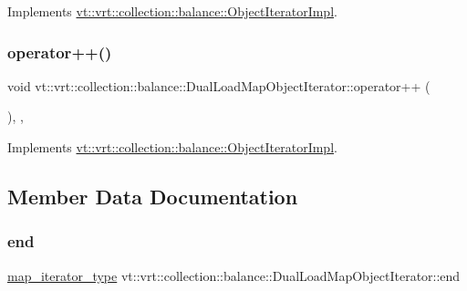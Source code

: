 Implements \hyperlink{structvt_1_1vrt_1_1collection_1_1balance_1_1_object_iterator_impl_a361451a08b7d2361ee9f0e5b3c35c089}{vt\+::vrt\+::collection\+::balance\+::\+Object\+Iterator\+Impl}.

\mbox{\label{structvt_1_1vrt_1_1collection_1_1balance_1_1_dual_load_map_object_iterator_a7cb1ececd261483b92541a35df607ca6}} 
\subsubsection{\texorpdfstring{operator++()}{operator++()}}
{\footnotesize\ttfamily void vt\+::vrt\+::collection\+::balance\+::\+Dual\+Load\+Map\+Object\+Iterator\+::operator++ (\begin{DoxyParamCaption}{ }\end{DoxyParamCaption})\hspace{0.3cm}{\ttfamily [inline]}, {\ttfamily [override]}, {\ttfamily [virtual]}}



Implements \hyperlink{structvt_1_1vrt_1_1collection_1_1balance_1_1_object_iterator_impl_ab59b65c6a22626b6d2d3ab283309ac1f}{vt\+::vrt\+::collection\+::balance\+::\+Object\+Iterator\+Impl}.



\subsection{Member Data Documentation}
\mbox{\label{structvt_1_1vrt_1_1collection_1_1balance_1_1_dual_load_map_object_iterator_aae2da6edc9d40ba415f4452aedc2782f}} 
\subsubsection{\texorpdfstring{end}{end}}
{\footnotesize\ttfamily \hyperlink{structvt_1_1vrt_1_1collection_1_1balance_1_1_dual_load_map_object_iterator_a86bac54b4dc71af6b0a7cf5aa7ced433}{map\+\_\+iterator\+\_\+type} vt\+::vrt\+::collection\+::balance\+::\+Dual\+Load\+Map\+Object\+Iterator\+::end}

